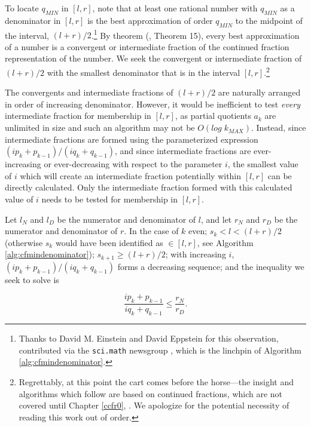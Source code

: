 To locate $q_{MIN}$ in $[l,r]$, note that at least one rational number
with $q_{MIN}$ as a denominator in $[l,r]$ is the best approximation
of order $q_{MIN}$ to the midpoint of the interval,
$(l+r)/2$.\footnote{Thanks to David M. Einstein \cite{bibref:i:davidmeinstein} 
and David Eppstein \cite{bibref:i:davideppstein}
for this observation, contributed via the \texttt{sci.math} newsgroup
\cite{bibref:n:scimathnewsgroup},
which is the linchpin of Algorithm \ref{alg:cfmindenominator}.}
By theorem (\cite{bibref:b:KhinchinClassic}, Theorem 15), every best approximation
of a number is a convergent or intermediate fraction of the
continued fraction representation of the number.  We seek the
convergent or intermediate fraction of $(l+r)/2$ with the smallest
denominator that is in the interval $[l,r]$.\footnote{Regrettably,
at this point the cart comes before the horse---the insight and
algorithms which follow are based on continued fractions, which
are not covered until Chapter \ref{ccfr0}, 
\emph{\ccfrzeroshorttitle{}}.  We apologize for the potential necessity
of reading this work out of order.}

The convergents and intermediate fractions of $(l+r)/2$ are naturally
arranged in order of increasing denominator.  However, it would be
inefficient to test \emph{every} intermediate fraction
for membership in $[l,r]$, as partial quotients $a_k$ are unlimited in
size and such an algorithm may not be $O(log \; k_{MAX})$.  Instead,
since intermediate fractions are formed using the parameterized
expression $(i p_k + p_{k-1})/(i q_k + q_{k-1})$,
and since intermediate fractions are ever-increasing
or ever-decreasing with respect to the parameter $i$, the
smallest value of $i$ which will create an intermediate
fraction potentially within $[l,r]$ can be directly
calculated.  Only the intermediate fraction formed with
this calculated value of $i$ needs to be tested for membership in
$[l,r]$.

Let $l_N$ and $l_D$ be the numerator and denominator of $l$, and
let $r_N$ and $r_D$ be the numerator and denominator of $r$.
In the case of $k$ even; $s_k < l < (l+r)/2$ (otherwise $s_k$
would have been identified as $\in [l,r]$, see Algorithm
\ref{alg:cfmindenominator}); $s_{k+1} \geq (l+r)/2$;
with increasing $i$, $(i p_k + p_{k-1})/(i q_k + q_{k-1})$
forms a decreasing sequence; and the inequality we seek to solve is

\begin{equation}
\label{eq:cfry0:schk0:ifselection01}
\frac{i p_k + p_{k-1}}{i q_k + q_{k-1}} \leq \frac{r_N}{r_D}.
\end{equation}


